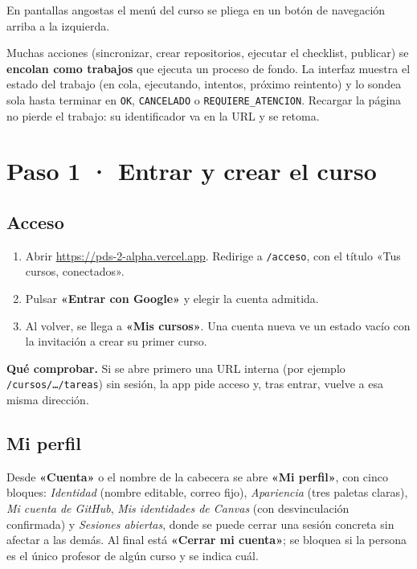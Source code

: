 \documentclass[11pt,a4paper]{article}
\newenvironment{comprobar}
  {\def\FrameCommand{\fcolorbox{verde}{verdefondo}}\MakeFramed{\advance\hsize-\width\FrameRestore}\noindent\textbf{\textcolor{verde}{Qué comprobar.}} }
  {\endMakeFramed}
\newcommand{\ui}[1]{\textbf{«#1»}}        %
\newcommand{\ruta}[1]{\texttt{#1}}        %
\begin{document}
En pantallas angostas el menú del curso se pliega en un botón de navegación arriba a la izquierda.

Muchas acciones (sincronizar, crear repositorios, ejecutar el checklist, publicar) se \textbf{encolan como trabajos} que ejecuta un proceso de fondo. La interfaz muestra el estado del trabajo (en cola, ejecutando, intentos, próximo reintento) y lo sondea sola hasta terminar en \texttt{OK}, \texttt{CANCELADO} o \texttt{REQUIERE\_ATENCION}. Recargar la página no pierde el trabajo: su identificador va en la URL y se retoma.

\section{Paso 1 · Entrar y crear el curso}

\subsection{Acceso}

\begin{enumerate}
  \item Abrir \url{https://pds-2-alpha.vercel.app}. Redirige a \ruta{/acceso}, con el título «Tus cursos, conectados».
  \item Pulsar \ui{Entrar con Google} y elegir la cuenta admitida.
  \item Al volver, se llega a \ui{Mis cursos}. Una cuenta nueva ve un estado vacío con la invitación a crear su primer curso.
\end{enumerate}

\begin{comprobar}
Si se abre primero una URL interna (por ejemplo \ruta{/cursos/\ldots/tareas}) sin sesión, la app pide acceso y, tras entrar, vuelve a esa misma dirección.
\end{comprobar}

\subsection{Mi perfil}

Desde \ui{Cuenta} o el nombre de la cabecera se abre \ui{Mi perfil}, con cinco bloques: \emph{Identidad} (nombre editable, correo fijo), \emph{Apariencia} (tres paletas claras), \emph{Mi cuenta de GitHub}, \emph{Mis identidades de Canvas} (con desvinculación confirmada) y \emph{Sesiones abiertas}, donde se puede cerrar una sesión concreta sin afectar a las demás. Al final está \ui{Cerrar mi cuenta}; se bloquea si la persona es el único profesor de algún curso y se indica cuál.
\end{document}
